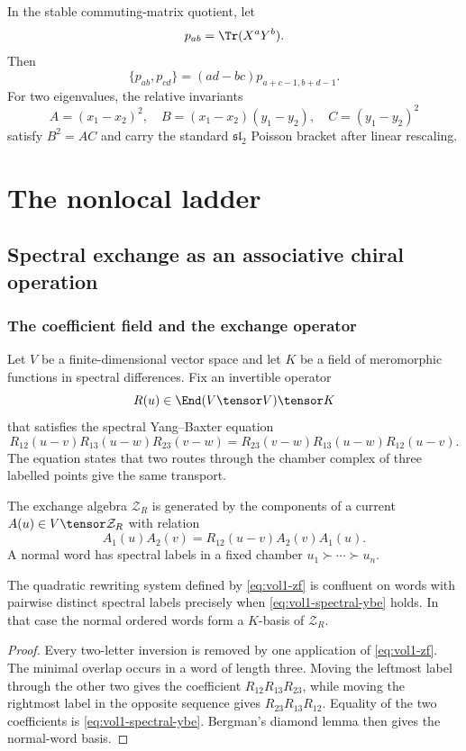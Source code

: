 In the stable commuting-matrix quotient, let
\[
 p_{ab}=\Tr(X^aY^b).
\]
Then
\[
 \{p_{ab},p_{cd}\}=(ad-bc)p_{a+c-1,b+d-1}.
\]
For two eigenvalues, the relative invariants
\[
 A=(x_1-x_2)^2,
 \quad B=(x_1-x_2)(y_1-y_2),
 \quad C=(y_1-y_2)^2
\]
satisfy $B^2=AC$ and carry the standard $\mathfrak{sl}_2$ Poisson bracket after linear rescaling.


\part{The nonlocal ladder}

\chapter{Spectral exchange as an associative chiral operation}
\section{The coefficient field and the exchange operator}
Let $V$ be a finite-dimensional vector space and let $K$ be a field of meromorphic functions in spectral differences.  Fix an invertible operator
\[
 R(u)\in\End(V\tensor V)\tensor K
\]
that satisfies the spectral Yang--Baxter equation
\begin{equation}\label{eq:vol1-spectral-ybe}
 R_{12}(u-v)R_{13}(u-w)R_{23}(v-w)
 =R_{23}(v-w)R_{13}(u-w)R_{12}(u-v).
\end{equation}
The equation states that two routes through the chamber complex of three labelled points give the same transport.

\begin{definition}
The exchange algebra $\mathcal Z_R$ is generated by the components of a current $A(u)\in V\tensor\mathcal Z_R$ with relation
\begin{equation}\label{eq:vol1-zf}
 A_1(u)A_2(v)=R_{12}(u-v)A_2(v)A_1(u).
\end{equation}
A normal word has spectral labels in a fixed chamber $u_1\succ\cdots\succ u_n$.
\end{definition}

\begin{theorem}
The quadratic rewriting system defined by \eqref{eq:vol1-zf} is confluent on words with pairwise distinct spectral labels precisely when \eqref{eq:vol1-spectral-ybe} holds.  In that case the normal ordered words form a $K$-basis of $\mathcal Z_R$.
\end{theorem}
\begin{proof}
Every two-letter inversion is removed by one application of \eqref{eq:vol1-zf}.  The minimal overlap occurs in a word of length three.  Moving the leftmost label through the other two gives the coefficient
$R_{12}R_{13}R_{23}$, while moving the rightmost label in the opposite sequence gives $R_{23}R_{13}R_{12}$.  Equality of the two coefficients is \eqref{eq:vol1-spectral-ybe}.  Bergman's diamond lemma then gives the normal-word basis.
\end{proof}

